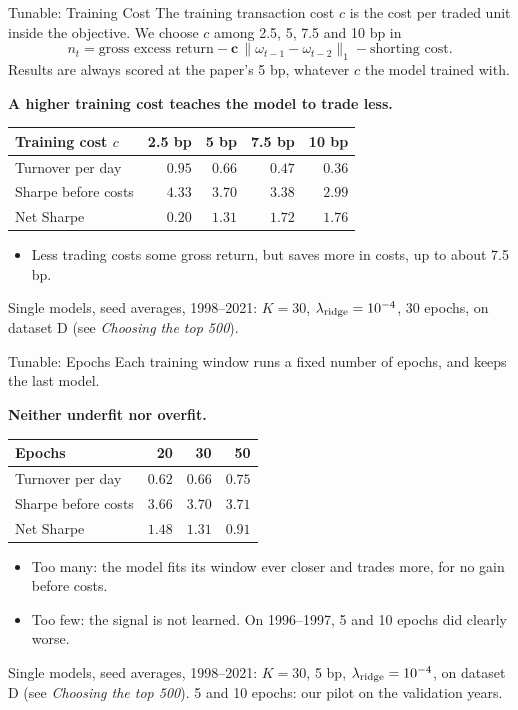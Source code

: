 \documentclass[11pt]{beamer}
\newcommand{\src}[1]{%
  \par\vfill
  {\fontsize{6.4}{7.6}\selectfont\color{Muted}#1\par}
}
\newcommand{\claim}[1]{%
  \par{\color{SBred}\bfseries #1\par}
}
\renewcommand{\src}[1]{%
  \par\vfill
  {\fontsize{6.4}{7.6}\selectfont#1\par}
}
\begin{document}
\begin{frame}{Tunable: Training Cost}
The training transaction cost $c$ is the cost per traded unit inside the objective.
We choose $c$ among 2.5, 5, 7.5 and 10 bp in
\[
n_t=\text{gross excess return}-\boldsymbol{c}\,\|\omega_{t-1}-\omega_{t-2}\|_1-\text{shorting cost}.
\]
Results are always scored at the paper's 5 bp, whatever $c$ the model trained with.
\claim{A higher training cost teaches the model to trade less.}
\begin{center}
\begin{tabular}{@{}lrrrr@{}}
\toprule
Training cost $c$ & 2.5 bp & 5 bp & 7.5 bp & 10 bp\\
\midrule
Turnover per day & $0.95$ & $0.66$ & $0.47$ & $0.36$\\
Sharpe before costs & $4.33$ & $3.70$ & $3.38$ & $2.99$\\
Net Sharpe & $0.20$ & $1.31$ & $1.72$ & $1.76$\\
\bottomrule
\end{tabular}
\end{center}
\begin{itemize}
\item Less trading costs some gross return, but saves more in costs, up to about 7.5 bp.
\end{itemize}
\src{Single models, seed averages, 1998--2021: $K=30$, $\lambda_{\rm ridge}=10^{-4}$, 30 epochs, on dataset D (see \emph{Choosing the top 500}).}
\end{frame}

\begin{frame}{Tunable: Epochs}
Each training window runs a fixed number of epochs, and keeps the last model.
\claim{Neither underfit nor overfit.}
\begin{center}
\begin{tabular}{@{}lrrr@{}}
\toprule
Epochs & 20 & 30 & 50\\
\midrule
Turnover per day & $0.62$ & $0.66$ & $0.75$\\
Sharpe before costs & $3.66$ & $3.70$ & $3.71$\\
Net Sharpe & $1.48$ & $1.31$ & $0.91$\\
\bottomrule
\end{tabular}
\end{center}
\begin{itemize}
\item Too many: the model fits its window ever closer and trades more, for no gain before costs.
\item Too few: the signal is not learned. On 1996--1997, 5 and 10 epochs did clearly worse.
\end{itemize}
\src{Single models, seed averages, 1998--2021: $K=30$, 5 bp, $\lambda_{\rm ridge}=10^{-4}$, on dataset D (see \emph{Choosing the top 500}). 5 and 10 epochs: our pilot on the validation years.}
\end{frame}
\end{document}
